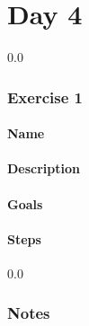 \part{Day 4}
{\setlength{\baselineskip}%
  {0.0\baselineskip}
  \section*{\flushright Exercise 1}
  \hrulefill \par}
\subsection{Name}

\subsection{Description}

\subsection{Goals}

\subsection{Steps}

\newpage
  {\setlength{\baselineskip}%
           {0.0\baselineskip}
  \section*{Notes}
  \hrulefill \par}